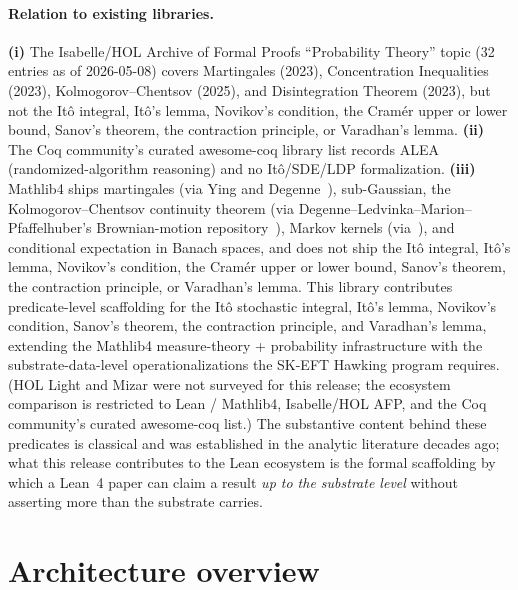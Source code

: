\documentclass[11pt]{article}
\begin{document}
\paragraph{Relation to existing libraries.}
\textbf{(i)} The Isabelle/HOL Archive of Formal Proofs
``Probability Theory'' topic (32 entries as of 2026-05-08) covers
Martingales (2023), Concentration Inequalities (2023),
Kolmogorov--Chentsov (2025), and Disintegration Theorem (2023), but
not the It\^o integral, It\^o's lemma, Novikov's condition, the
Cram\'er upper or lower bound, Sanov's theorem, the contraction
principle, or Varadhan's lemma.
\textbf{(ii)} The Coq community's curated awesome-coq library list
records ALEA (randomized-algorithm reasoning) and no Itô/SDE/LDP
formalization.
\textbf{(iii)} Mathlib4 ships martingales (via Ying and
Degenne~\cite{YingDegenne2022Martingales}), sub-Gaussian, the
Kolmogorov--Chentsov continuity theorem (via Degenne--Ledvinka--Marion--Pfaffelhuber's
Brownian-motion repository~\cite{Degenne2025BrownianMotion}), Markov
kernels (via~\cite{Degenne2025MarkovKernels}), and conditional
expectation in Banach spaces, and does not ship the It\^o integral,
It\^o's lemma, Novikov's condition, the Cram\'er upper or lower
bound, Sanov's theorem, the contraction principle, or Varadhan's
lemma. This library contributes predicate-level scaffolding for the
It\^o stochastic integral, It\^o's lemma, Novikov's condition, Sanov's
theorem, the contraction principle, and Varadhan's lemma, extending
the Mathlib4 measure-theory + probability infrastructure with the
substrate-data-level operationalizations the SK-EFT Hawking program
requires. (HOL Light and Mizar were not surveyed for this release; the
ecosystem comparison is restricted to Lean / Mathlib4, Isabelle/HOL
AFP, and the Coq community's curated awesome-coq list.) The substantive
content behind these predicates is classical and was established in
the analytic literature decades ago; what this release contributes to
the Lean ecosystem is the formal scaffolding by which a Lean~4 paper
can claim a result \emph{up to the substrate level} without asserting
more than the substrate carries.


\section{Architecture overview}
\label{sec:architecture}
\end{document}
